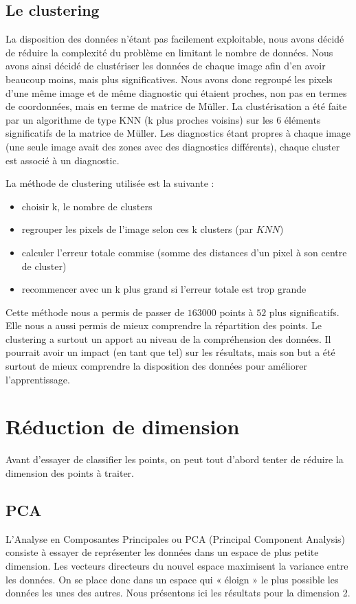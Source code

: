 \documentclass[a4paper,10pt]{report}
\begin{document}
\subsection{Le clustering}
La disposition des données n'étant pas facilement exploitable, nous avons décidé de réduire la complexité du problème en limitant le nombre de données. Nous avons ainsi décidé de clustériser les données de chaque image afin d'en avoir beaucoup moins, mais plus significatives. Nous avons donc regroupé les pixels d’une même image et de même diagnostic qui étaient proches, non pas en termes de coordonnées, mais en terme de matrice de Müller. La clustérisation a été faite par un algorithme de type KNN (k plus proches voisins) sur les $6$ éléments significatifs de la matrice de Müller. Les diagnostics étant propres à chaque image (une seule image avait des zones avec des diagnostics différents), chaque cluster est associé à un diagnostic. 

La méthode de clustering utilisée est la suivante :
\begin{itemize}
\item choisir k, le nombre de clusters
\item regrouper les pixels de l'image selon ces k clusters (par $KNN$)
\item calculer l'erreur totale commise (somme des distances d’un pixel à son centre de cluster)
\item recommencer avec un k plus grand si l'erreur totale est trop grande
\end{itemize}

Cette méthode nous a permis de passer de $163 000$ points à $52$ plus significatifs. Elle nous a aussi permis de mieux comprendre la répartition des points. Le clustering a surtout un apport au niveau de la compréhension des données. Il pourrait avoir un impact (en tant que tel) sur les résultats, mais son but a été surtout de mieux comprendre la disposition des données pour améliorer l’apprentissage.

\section{Réduction de dimension}

Avant d'essayer de classifier les points, on peut tout d’abord tenter de réduire la dimension des points à traiter.

\subsection{PCA}
L'Analyse en Composantes Principales ou PCA (Principal Component Analysis) consiste à essayer de représenter les données dans un espace de plus petite dimension. Les vecteurs directeurs du nouvel espace maximisent la variance entre les données. On se place donc dans un espace qui « éloign » le plus possible les données les unes des autres. Nous présentons ici les résultats pour la dimension 2.
\end{document}
